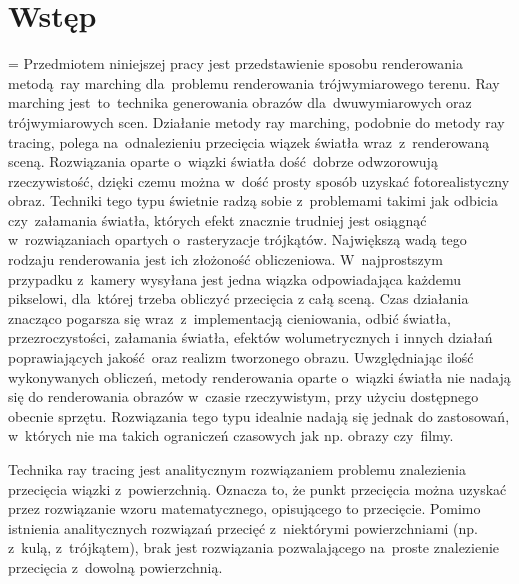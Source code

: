 \chapter{Wstęp}
\label{ch:wstep}
\emergencystretch=\maxdimen
Przedmiotem niniejszej pracy jest przedstawienie sposobu renderowania metodą ray marching dla~problemu renderowania trójwymiarowego terenu.
Ray marching jest~to~technika generowania obrazów dla~dwuwymiarowych oraz trójwymiarowych scen\cite{bib:gcraymarch}.
Działanie metody ray marching, podobnie do metody ray tracing, polega na~odnalezieniu przecięcia wiązek światła wraz~z~renderowaną sceną.
Rozwiązania oparte o~wiązki światła dość dobrze odwzorowują rzeczywistość, dzięki czemu można w~dość prosty sposób uzyskać fotorealistyczny obraz.
Techniki tego typu świetnie radzą sobie z~problemami takimi jak odbicia czy~załamania światła, których efekt znacznie trudniej jest osiągnąć w~rozwiązaniach opartych o~rasteryzacje trójkątów.
Największą wadą tego rodzaju renderowania jest ich złożoność obliczeniowa. W~najprostszym przypadku z~kamery wysyłana jest jedna wiązka odpowiadająca każdemu pikselowi, dla~której trzeba obliczyć przecięcia z całą sceną.
Czas działania znacząco pogarsza się wraz~z~implementacją cieniowania, odbić światła, przezroczystości, załamania światła, efektów wolumetrycznych i innych działań poprawiających jakość oraz realizm tworzonego obrazu.
Uwzględniając ilość wykonywanych obliczeń, metody renderowania oparte o~wiązki światła nie nadają się do renderowania obrazów w~czasie rzeczywistym, przy użyciu dostępnego obecnie sprzętu.
Rozwiązania tego typu idealnie nadają się jednak do zastosowań, w~których nie ma takich ograniczeń czasowych jak np. obrazy czy~filmy.

Technika ray tracing jest analitycznym rozwiązaniem problemu znalezienia przecięcia wiązki z~powierzchnią.
Oznacza to, że punkt przecięcia można uzyskać przez rozwiązanie wzoru matematycznego, opisującego to przecięcie.
Pomimo istnienia analitycznych rozwiązań przecięć z~niektórymi powierzchniami (np. z~kulą, z~trójkątem), brak jest rozwiązania
pozwalającego na~proste znalezienie przecięcia z~dowolną powierzchnią.

